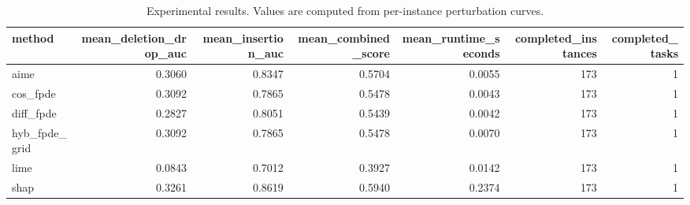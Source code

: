 \begin{table}[t]
\caption{Experimental results. Values are computed from per-instance perturbation curves.}
\label{tab:main_results_computed}
\centering
\begin{tabular}{lrrrrrr}
\toprule
method & mean\_deletion\_drop\_auc & mean\_insertion\_auc & mean\_combined\_score & mean\_runtime\_seconds & completed\_instances & completed\_tasks \\
\midrule
aime & 0.3060 & 0.8347 & 0.5704 & 0.0055 & 173 & 1 \\
cos\_fpde & 0.3092 & 0.7865 & 0.5478 & 0.0043 & 173 & 1 \\
diff\_fpde & 0.2827 & 0.8051 & 0.5439 & 0.0042 & 173 & 1 \\
hyb\_fpde\_grid & 0.3092 & 0.7865 & 0.5478 & 0.0070 & 173 & 1 \\
lime & 0.0843 & 0.7012 & 0.3927 & 0.0142 & 173 & 1 \\
shap & 0.3261 & 0.8619 & 0.5940 & 0.2374 & 173 & 1 \\
\bottomrule
\end{tabular}

\end{table}
